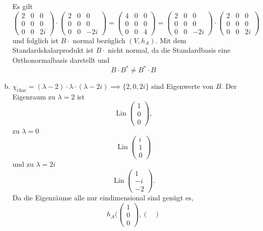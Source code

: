\documentclass{article}
\theoremstyle{definition}
\begin{document}
\begin{enumerate}[(a)]
	Es gilt
	$$\begin{pmatrix}
		2 & 0 & 0\\
		0 & 0 & 0\\
		0 & 0 & 2i
	\end{pmatrix} \cdot \begin{pmatrix}
		2 & 0 & 0\\
		0 & 0 & 0\\
		0 & 0 & -2i
	\end{pmatrix} = \begin{pmatrix}
		4 & 0 & 0\\
		0 & 0 & 0\\
		0 & 0 & 4
	\end{pmatrix} = \begin{pmatrix}
		2 & 0 & 0\\
		0 & 0 & 0\\
		0 & 0 & -2i
	\end{pmatrix} \cdot \begin{pmatrix}
		2 & 0 & 0\\
		0 & 0 & 0\\
		0 & 0 & 2i
	\end{pmatrix}$$ und folglich ist $B\cdot $ normal bezüglich $(V, h_A)$.
	Mit dem Standardskalarprodukt ist $B \cdot$ nicht normal, da die Standardbasis eine Orthonormalbasis darstellt und $$B \cdot B^* \neq B^* \cdot B$$
	\item $\chi_\text{char} = (\lambda - 2)\cdot \lambda \cdot (\lambda - 2i) \implies \{2, 0, 2i\}$ sind Eigenwerte von $B$. Der Eigenraum zu $\lambda = 2$ ist $$\operatorname{Lin} \begin{pmatrix}
		1\\ 0 \\ 0
	\end{pmatrix},$$ zu $\lambda = 0$ $$\operatorname{Lin} \begin{pmatrix}
		i\\1\\0
	\end{pmatrix}$$ und zu $\lambda = 2i$ $$\operatorname{Lin} \begin{pmatrix}
		1\\ -i\\ -2
	\end{pmatrix}.$$ Da die Eigenräume alle nur eindimensional sind genügt es, $$h_A(\begin{pmatrix}
		1\\ 0 \\ 0
	\end{pmatrix}, \begin{pmatrix}

\end{pmatrix}$$
\end{enumerate}
\end{document}
